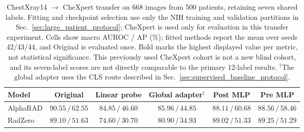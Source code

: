 \begin{table}[!t]
\centering
\small
\setlength{\tabcolsep}{4pt}
\renewcommand{\arraystretch}{1.15}
\begin{tabular*}{\textwidth}{@{\extracolsep{\fill}}lccccc@{}}
\toprule
Model & Original & Linear probe & Global adapter$^{\dagger}$ & Post MLP & Pre MLP \\
\midrule
AlphaRAD & $\mathbf{90.55}\,/\,\mathbf{62.55}$ & $84.85\,/\,46.60$ & $85.96\,/\,44.85$ & $88.11\,/\,60.68$ & $88.56\,/\,58.46$ \\
RadZero & $89.10\,/\,\mathbf{51.63}$ & $74.60\,/\,30.70$ & $80.90\,/\,34.93$ & $89.02\,/\,51.33$ & $\mathbf{89.25}\,/\,51.29$ \\
\bottomrule
\end{tabular*}
\caption{ChestXray14 $\rightarrow$ CheXpert transfer on 668 images from 500 patients, retaining seven shared labels. Fitting and checkpoint selection use only the NIH training and validation partitions in Sec.~\ref{sec:large_patient_protocol}; CheXpert is used only for evaluation in this transfer experiment. Cells show macro AUROC / AP (\%); fitted methods report the mean over seeds 42/43/44, and Original is evaluated once. Bold marks the highest displayed value per metric, not statistical significance. This previously used CheXpert cohort is not a new blind cohort, and its seven-label scores are not directly comparable to the primary 12-label results. $^{\dagger}$The global adapter uses the CLS route described in Sec.~\ref{sec:supervised_baseline_protocol}.}
\label{tab:token_mlp_transfer}
\end{table}
